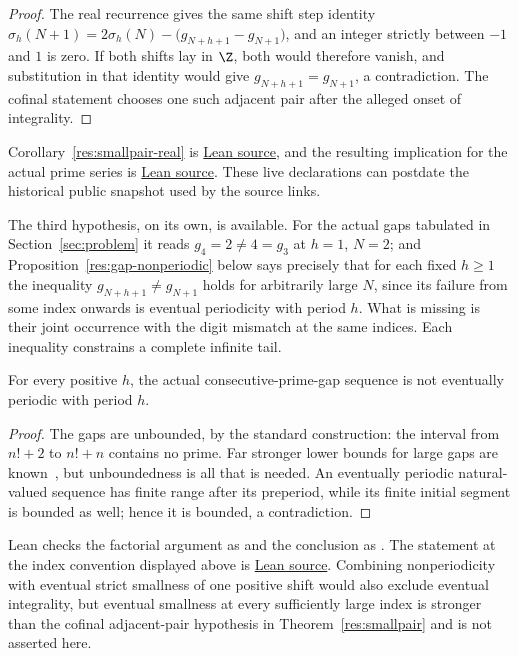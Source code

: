 \documentclass[11pt]{article}
\begin{document}
\begin{proof}
The real recurrence gives the same shift step identity
$\sigma_h(N+1)=2\sigma_h(N)-\bigl(g_{N+h+1}-g_{N+1}\bigr)$, and an integer
strictly between $-1$ and $1$ is zero.  If both shifts lay in $\Z$, both would
therefore vanish, and substitution in that identity would give
$g_{N+h+1}=g_{N+1}$, a contradiction.  The cofinal statement chooses one such
adjacent pair after the alleged onset of integrality.
\end{proof}

\noindent Corollary~\ref{res:smallpair-real} is
\href{https://github.com/wcook04/plectis-erdos/blob/f36a98bf3d3e6f65f1074e3b800e3293d5b8a51a/ErdosProblems/Erdos251/PaperCoreR7.lean#L282}{Lean source}, and the resulting implication for the
actual prime series is \href{https://github.com/wcook04/plectis-erdos/blob/f36a98bf3d3e6f65f1074e3b800e3293d5b8a51a/ErdosProblems/Erdos251/PaperCoreR7.lean#L298}{Lean source}.  These live
declarations can postdate the historical public snapshot used by the source
links.

The third hypothesis, on its own, is available.  For the actual gaps tabulated
in Section~\ref{sec:problem} it reads $g_4=2\ne4=g_3$ at $h=1$, $N=2$; and
Proposition~\ref{res:gap-nonperiodic} below says precisely that for each fixed
$h\ge1$ the inequality $g_{N+h+1}\ne g_{N+1}$ holds for arbitrarily large $N$,
since its failure from some index onwards is eventual periodicity with period
$h$.  What is missing is their joint occurrence with the digit mismatch at the
same indices.  Each inequality constrains a complete infinite tail.

\begin{proposition}\label{res:gap-nonperiodic}
For every positive $h$, the actual consecutive-prime-gap sequence is not
eventually periodic with period $h$.
\end{proposition}

\begin{proof}
The gaps are unbounded, by the standard construction: the interval from $n!+2$
to $n!+n$ contains no prime.  Far stronger lower bounds for large gaps are
known~\cite[Theorem~1, p.~66]{fgkmt2018}, but unboundedness is all that is
needed.  An
eventually periodic natural-valued sequence has finite range after its
preperiod, while its finite initial segment is bounded as well; hence it is
bounded, a contradiction.
\end{proof}

\noindent Lean checks the factorial argument as
 and the conclusion as
.  The statement at the index convention displayed above is
\href{https://github.com/wcook04/plectis-erdos/blob/f36a98bf3d3e6f65f1074e3b800e3293d5b8a51a/ErdosProblems/Erdos251/PaperCoreR7.lean#L175}{Lean source}.  Combining nonperiodicity with eventual strict smallness of one
positive shift would also exclude eventual integrality, but eventual
smallness at every sufficiently large index is stronger than the cofinal
adjacent-pair hypothesis in Theorem~\ref{res:smallpair} and is not asserted
here.
\end{document}

